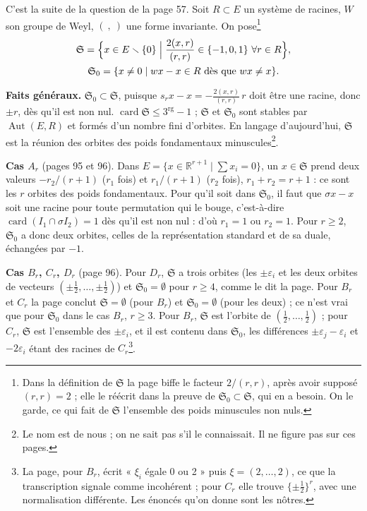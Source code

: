 \documentclass[11pt,a4paper]{article}
\begin{document}
C'est la suite de la question de la page 57. Soit $R \subset E$ un système de
racines, $W$ son groupe de Weyl, $(\ ,\ )$ une forme invariante. On pose\footnote{Dans la définition de $\mathfrak{S}$ la page biffe le facteur
$2/(r,r)$, après avoir supposé $(r, r) = 2$ ; elle le réécrit dans la preuve
de $\mathfrak{S}_0 \subset \mathfrak{S}$, qui en a besoin. On le garde, ce qui
fait de $\mathfrak{S}$ l'ensemble des poids minuscules non nuls.}
\[
\begin{gathered}
\mathfrak{S} = \Bigl\lbrace x \in E \smallsetminus \lbrace 0\rbrace \Bigm|
\frac{2(x, r)}{(r, r)} \in \lbrace -1, 0, 1\rbrace \ \forall r \in R\Bigr\rbrace,
\\ \mathfrak{S}_0 = \lbrace x \neq 0 \mid wx - x \in R \text{ dès que } wx
\neq x\rbrace .
\end{gathered}
\]

\textbf{Faits généraux.} $\mathfrak{S}_0 \subset \mathfrak{S}$, puisque $s_r x
- x = -\tfrac{2(x, r)}{(r, r)}\, r$ doit être une racine, donc $\pm r$, dès
qu'il est non nul. $\operatorname{card} \mathfrak{S} \leq 3^{\operatorname{rg}}
- 1$ ; $\mathfrak{S}$ et $\mathfrak{S}_0$ sont stables par
$\operatorname{Aut}(E, R)$ et formés d'un nombre fini d'orbites. En langage
d'aujourd'hui, $\mathfrak{S}$ est la réunion des orbites des poids
fondamentaux minuscules\footnote{Le nom est de nous ; on ne sait pas s'il le
connaissait. Il ne figure pas sur ces pages.}.

\textbf{Cas $A_r$} (pages 95 et 96). Dans $E = \lbrace x \in \mathbb{R}^{r+1}
\mid \sum x_i = 0\rbrace$, un $x \in \mathfrak{S}$ prend deux valeurs
$-r_2/(r+1)$ ($r_1$ fois) et $r_1/(r+1)$ ($r_2$ fois), $r_1 + r_2 = r + 1$ :
ce sont les $r$ orbites des poids fondamentaux. Pour qu'il soit dans
$\mathfrak{S}_0$, il faut que $\sigma x - x$ soit une racine pour toute
permutation qui le bouge, c'est-à-dire $\operatorname{card}(I_1 \cap \sigma
I_2) = 1$ dès qu'il est non nul : d'où $r_1 = 1$ ou $r_2 = 1$. Pour $r \geq 2$,
$\mathfrak{S}_0$ a donc deux orbites, celles de la représentation standard et
de sa duale, échangées par $-1$.

\textbf{Cas $B_r$, $C_r$, $D_r$} (page 96). Pour $D_r$, $\mathfrak{S}$ a trois
orbites (les $\pm \varepsilon_i$ et les deux orbites de vecteurs $(\pm\tfrac12,
\ldots, \pm\tfrac12)$) et $\mathfrak{S}_0 = \emptyset$ pour $r \geq 4$, comme le
dit la page. Pour $B_r$ et $C_r$ la page conclut $\mathfrak{S} = \emptyset$
(pour $B_r$) et $\mathfrak{S}_0 = \emptyset$ (pour les deux) ; ce n'est vrai
que pour $\mathfrak{S}_0$ dans le cas $B_r$, $r \geq 3$. Pour $B_r$,
$\mathfrak{S}$ est l'orbite de $(\tfrac12, \ldots, \tfrac12)$ ; pour $C_r$,
$\mathfrak{S}$ est l'ensemble des $\pm\varepsilon_i$, et il est contenu dans
$\mathfrak{S}_0$, les différences $\pm\varepsilon_j - \varepsilon_i$ et
$-2\varepsilon_i$ étant des racines de $C_r$\footnote{La page, pour $B_r$,
écrit « $\xi_i$ égale 0 ou 2 » puis $\xi = (2, \ldots, 2)$, ce que la
transcription signale comme incohérent ; pour $C_r$ elle trouve $\lbrace \pm
\tfrac12\rbrace^r$, avec une normalisation différente. Les énoncés qu'on donne
sont les nôtres.}.
\end{document}
